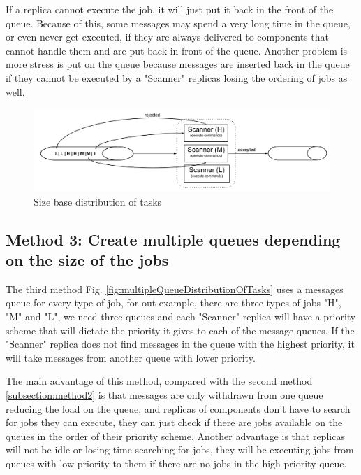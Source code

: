 If a replica cannot execute the job, it will just put it back in the front of the queue. Because of this, some messages may spend a very long time in the queue, or even never get executed, if they are always delivered to components that cannot handle them and are put back in front of the queue. Another problem is more stress is put on the queue  because messages are inserted back in the queue if they cannot be executed by a "Scanner" replicas losing the ordering of jobs as well.

\begin{figure}[ht]
\centering
\includegraphics[width=\linewidth]{./img/2_PriorityLoadBalancing.png}
\caption{Size base distribution of tasks}
\label{fig:sizeBaseDistributionOftasks}
\end{figure}


\subsection{Method 3: Create multiple queues depending on the size of the jobs}
\label{subsection:method3}
The third method Fig. \ref{fig:multipleQueueDistributionOfTasks} uses a messages queue for every type of job, for out example, there are three types of jobs "H", "M" and "L", we need three queues and each "Scanner" replica will have a priority scheme that will dictate the priority it gives to each of the message queues. If the "Scanner" replica does not find messages in the queue with the highest priority, it will take messages from another queue with lower priority. 

The main advantage of this method, compared with the second method \ref{subsection:method2} is that messages are only withdrawn from one queue reducing the load on the queue, and replicas of components don't have to search for jobs they can execute, they can just check if there are jobs available on the queues in the order of their priority scheme. Another advantage is that replicas will not be idle or losing time searching for jobs, they will be executing jobs from queues with low priority to them if there are no jobs in the high priority queue.

